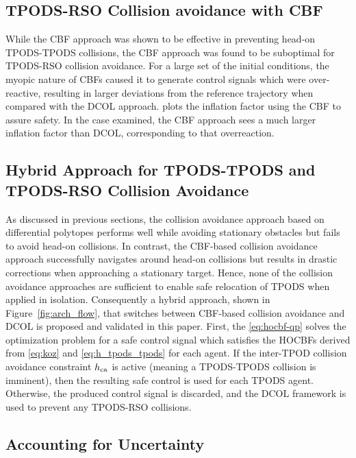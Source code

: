 \subsection{TPODS-RSO Collision avoidance with CBF}
While the CBF approach was shown to be effective in preventing head-on TPODS-TPODS collisions, the CBF approach was found to be suboptimal for TPODS-RSO collision avoidance. For a large set of the initial conditions, the myopic nature of CBFs caused it to generate control signals which were over-reactive, resulting in larger deviations from the reference trajectory when compared with the DCOL approach.  plots the inflation factor using the CBF to assure safety. In the case examined, the CBF approach sees a much larger inflation factor than DCOL, corresponding to that overreaction.

\subsection{Hybrid Approach for TPODS-TPODS and TPODS-RSO Collision Avoidance}
As discussed in previous sections, the collision avoidance approach based on 
differential polytopes performs well while avoiding stationary obstacles but fails to avoid head-on collisions. In contrast, the CBF-based collision avoidance approach successfully navigates around head-on collisions but results in drastic corrections when approaching a stationary target. Hence, none of the collision avoidance approaches are sufficient to enable safe relocation of TPODS when applied in isolation. Consequently a hybrid approach, shown in Figure~\ref{fig:arch_flow}, that switches between CBF-based collision avoidance and DCOL is proposed and validated in this paper. First, the \eqref{eq:hocbf-qp} solves the optimization problem for a safe control signal which satisfies the HOCBFs derived from \eqref{eq:koz} and \eqref{eq:h_tpods_tpods} for each agent. If the inter-TPOD collision avoidance constraint $h_{\rm ca}$ is active (meaning a TPODS-TPODS collision is imminent), then the resulting safe control is used for each TPODS agent. Otherwise, the produced control signal is discarded, and the DCOL framework is used to prevent any TPODS-RSO collisions.

\subsection{Accounting for Uncertainty}

